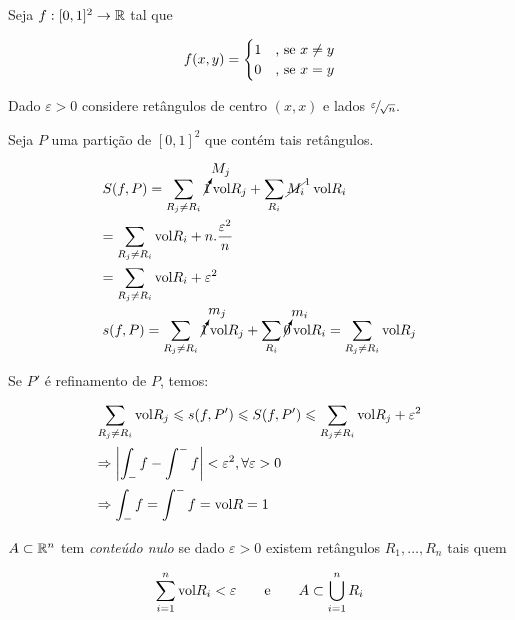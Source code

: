 \documentclass{book}
\newcommand{\SomaR}[2][i]{\sum\limits_{#1} {#2}}
\begin{document}
\begin{ex}
Seja $f:[0,1]^2 \to \mathbb{R}$ tal que

\begin{equation*}
  f(x,y) =
  \begin{cases}
    \hfill 1 	& \mbox{, se } x \ne y \\
    \hfill 0 	& \mbox{, se } x = y
  \end{cases}
\end{equation*}
\end{ex}

\begin{sol}
Dado $\varepsilon > 0$ considere ret\^angulos de centro $(x,x)$ e lados $\mfrac{\varepsilon}{\sqrt n}$.

Seja $P$ uma parti\c c\~ao de $[0,1]^2$ que cont\'em tais ret\^angulos.

\[
\begin{gathered}
  S(f,P) = \SomaR[R_j \ne R_i]{\mathop {\cancelto{M_j}{1}} \text{vol}R_j} + \SomaR[R_i]{\mathop {\cancel{M_i}}\nolimits^1 \text{vol}R_i} \hfill \\
   = \SomaR[R_j \ne R_i]{\text{vol}R_i} + n.\frac{{\varepsilon ^2 }}
{n} \hfill \\
   = \SomaR[R_j \ne R_i]{\text{vol}R_i} + \varepsilon ^2  \hfill \\
  s(f,P) = \SomaR[R_j \ne R_i]{\mathop {\cancelto{m_j}{1}} \text{vol}R_j} + \SomaR[R_i]{\mathop {\cancelto{m_i}{0}} \text{vol}R_i} = \SomaR[R_j \ne R_i]{\text{vol}R_j} \hfill \\ 
\end{gathered} 
\]

Se $P'$ \'e refinamento de $P$, temos:

\[
\begin{gathered}
  \SomaR[R_j \ne R_i]{\text{vol}R_j} \mei s(f,P') \mei S(f,P') \mei \SomaR[R_j \ne R_i]{\text{vol}R_j} + \varepsilon^2 \hfill \\
  \imp \left| {\int_{-} f - \int^{-} f} \right| < \varepsilon^2 ,\forall \varepsilon > 0 \hfill \\
  \imp \int_{-} f = \int^{-} f = \text{vol}R = 1 \hfill \\ 
\end{gathered} 
\]

\end{sol}

\begin{defn}
$A \subset \mathbb{R}^n$ tem \textit{conte\'udo nulo} se dado $\varepsilon > 0$ existem ret\^angulos $R_1,\ldots,R_n$ tais quem

\[
\sum\limits_{i = 1}^n {\text{vol}R_i} < \varepsilon \qquad \text{e} \qquad A \subset \bigcup\limits_{i=1}^n {R_i}
\]
\end{defn}
\end{document}
